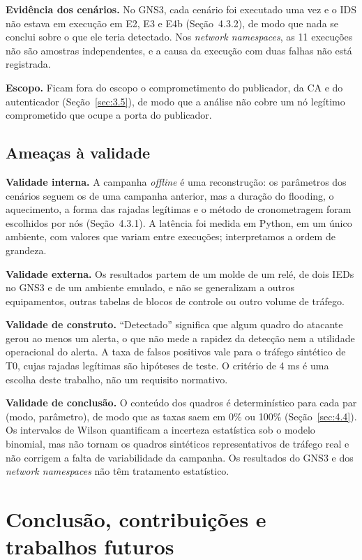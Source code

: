\documentclass[12pt]{article}
\begin{document}
\textbf{Evidência dos cenários.} No GNS3, cada cenário foi executado uma vez e o IDS não estava em execução em E2, E3 e E4b (Seção~4.3.2), de modo que nada se conclui sobre o que ele teria detectado. Nos \emph{network namespaces}, as 11 execuções não são amostras independentes, e a causa da execução com duas falhas não está registrada.

\textbf{Escopo.} Ficam fora do escopo o comprometimento do publicador, da CA e do autenticador (Seção~\ref{sec:3.5}), de modo que a análise não cobre um nó legítimo comprometido que ocupe a porta do publicador.

\subsection{Ameaças à validade}\label{sec:7.3}

\textbf{Validade interna.} A campanha \emph{offline} é uma reconstrução: os parâmetros dos cenários seguem os de uma campanha anterior, mas a duração do flooding, o aquecimento, a forma das rajadas legítimas e o método de cronometragem foram escolhidos por nós (Seção~4.3.1). A latência foi medida em Python, em um único ambiente, com valores que variam entre execuções; interpretamos a ordem de grandeza.

\textbf{Validade externa.} Os resultados partem de um molde de um relé, de dois IEDs no GNS3 e de um ambiente emulado, e não se generalizam a outros equipamentos, outras tabelas de blocos de controle ou outro volume de tráfego.

\textbf{Validade de construto.} \textquotedblleft{}Detectado\textquotedblright{} significa que algum quadro do atacante gerou ao menos um alerta, o que não mede a rapidez da detecção nem a utilidade operacional do alerta. A taxa de falsos positivos vale para o tráfego sintético de T0, cujas rajadas legítimas são hipóteses de teste. O critério de 4 ms é uma escolha deste trabalho, não um requisito normativo.

\textbf{Validade de conclusão.} O conteúdo dos quadros é determinístico para cada par (modo, parâmetro), de modo que as taxas saem em 0\% ou 100\% (Seção~\ref{sec:4.4}). Os intervalos de Wilson quantificam a incerteza estatística sob o modelo binomial, mas não tornam os quadros sintéticos representativos de tráfego real e não corrigem a falta de variabilidade da campanha. Os resultados do GNS3 e dos \emph{network namespaces} não têm tratamento estatístico.

\section{Conclusão, contribuições e trabalhos futuros}\label{sec:8}
\end{document}
